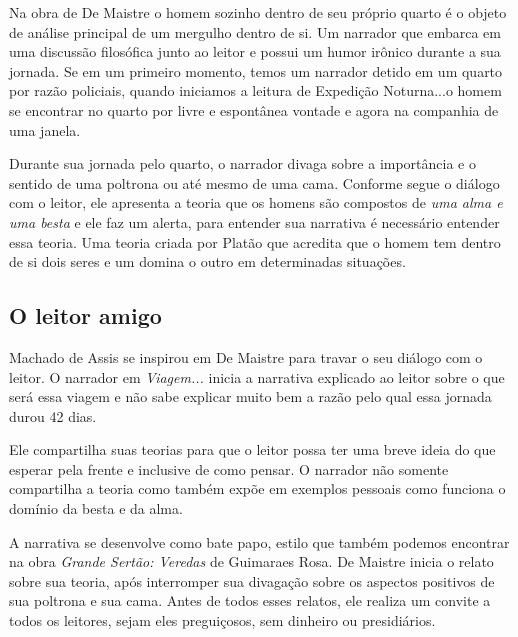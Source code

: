 \documentclass[12pt]{extarticle}
\begin{document}
Na obra de De Maistre o homem sozinho dentro de seu próprio quarto é o
objeto de análise principal de um mergulho dentro de si. Um narrador que
embarca em uma discussão filosófica junto ao leitor e possui um humor
irônico durante a sua jornada. Se em um primeiro momento, temos um
narrador detido em um quarto por razão policiais, quando iniciamos a
leitura de Expedição Noturna...o homem se encontrar no quarto por livre
e espontânea vontade e agora na companhia de uma janela.

Durante sua jornada pelo quarto, o narrador divaga sobre a importância e
o sentido de uma poltrona ou até mesmo de uma cama. Conforme segue o
diálogo com o leitor, ele apresenta a teoria que os homens são compostos
de \emph{uma alma e uma besta} e ele faz um alerta, para entender sua
narrativa é necessário entender essa teoria. Uma teoria criada por
Platão que acredita que o homem tem dentro de si dois seres e um domina
o outro em determinadas situações.

\subsection{O leitor amigo}

Machado de Assis se inspirou em De Maistre para travar o seu diálogo com
o leitor. O narrador em \emph{Viagem...} inicia a narrativa explicado ao
leitor sobre o que será essa viagem e não sabe explicar muito bem a
razão pelo qual essa jornada durou 42 dias.




Ele compartilha suas teorias para que o leitor possa ter uma breve ideia
do que esperar pela frente e inclusive de como pensar. O narrador não
somente compartilha a teoria como também expõe em exemplos pessoais como
funciona o domínio da besta e da alma.

A narrativa se desenvolve como bate papo, estilo que também podemos
encontrar na obra \textit{Grande Sertão: Veredas} de Guimaraes Rosa. De
Maistre inicia o relato sobre sua teoria, após interromper sua divagação
sobre os aspectos positivos de sua poltrona e sua cama. Antes de todos
esses relatos, ele realiza um convite a todos os leitores, sejam eles
preguiçosos, sem dinheiro ou presidiários.
\end{document}
